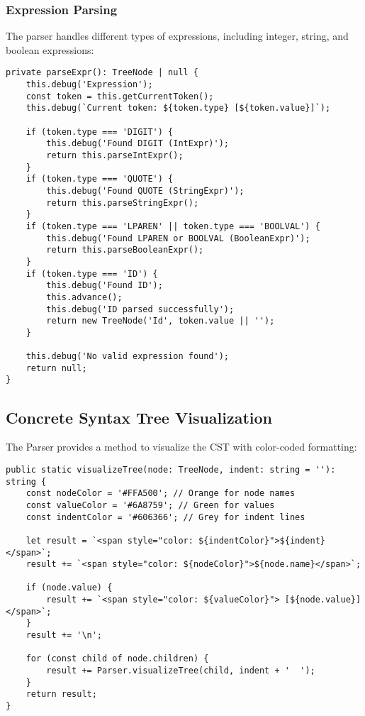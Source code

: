 \documentclass[12pt]{article}
\begin{document}
\subsubsection{Expression Parsing}
The parser handles different types of expressions, including integer, string, and boolean expressions:

\begin{lstlisting}
private parseExpr(): TreeNode | null {
    this.debug('Expression');
    const token = this.getCurrentToken();
    this.debug(`Current token: ${token.type} [${token.value}]`);
    
    if (token.type === 'DIGIT') {
        this.debug('Found DIGIT (IntExpr)');
        return this.parseIntExpr();
    }
    if (token.type === 'QUOTE') {
        this.debug('Found QUOTE (StringExpr)');
        return this.parseStringExpr();
    }
    if (token.type === 'LPAREN' || token.type === 'BOOLVAL') {
        this.debug('Found LPAREN or BOOLVAL (BooleanExpr)');
        return this.parseBooleanExpr();
    }
    if (token.type === 'ID') {
        this.debug('Found ID');
        this.advance();
        this.debug('ID parsed successfully');
        return new TreeNode('Id', token.value || '');
    }
    
    this.debug('No valid expression found');
    return null;
}
\end{lstlisting}

\subsection{Concrete Syntax Tree Visualization}
The Parser provides a method to visualize the CST with color-coded formatting:

\begin{lstlisting}
public static visualizeTree(node: TreeNode, indent: string = ''): string {
    const nodeColor = '#FFA500'; // Orange for node names
    const valueColor = '#6A8759'; // Green for values
    const indentColor = '#606366'; // Grey for indent lines

    let result = `<span style="color: ${indentColor}">${indent}</span>`;
    result += `<span style="color: ${nodeColor}">${node.name}</span>`;
    
    if (node.value) {
        result += `<span style="color: ${valueColor}"> [${node.value}]</span>`;
    }
    result += '\n';

    for (const child of node.children) {
        result += Parser.visualizeTree(child, indent + '  ');
    }
    return result;
}
\end{lstlisting}
\end{document}
